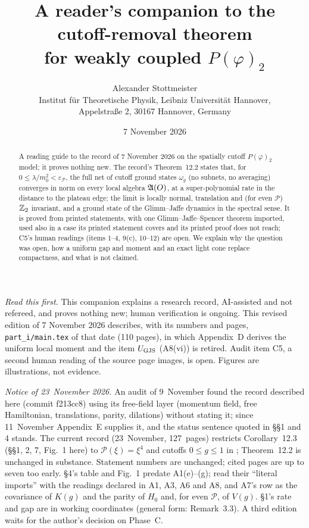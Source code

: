 \documentclass[11pt,a4paper]{article}
\title{A reader's companion to the cutoff-removal theorem\\ for weakly coupled $P(\varphi)_2$}
\author{Alexander Stottmeister\\[3pt]
  \normalsize Institut f\"ur Theoretische Physik, Leibniz Universit\"at Hannover,\\
  \normalsize Appelstra\ss e 2, 30167 Hannover, Germany}
\date{7 November 2026}
\begin{document}
\maketitle
\kern-6pt

\begin{statusnotice}\footnotesize
\emph{Read this first.} This companion explains a research record, AI-assisted and not
refereed, and proves nothing new; human verification is ongoing. This revised edition of
7 November 2026 describes, with its numbers and pages, \texttt{part\_i/main.tex} of that
date (110 pages), in which Appendix~D derives the uniform local moment and the item
$U_{\mathrm{GJS}}$ (A8(vi)) is retired. Audit item C5, a second human reading of the source page
images, is open. Figures are illustrations, not evidence.

\smallskip
\emph{Notice of 23~November 2026.} An audit of 9~November found the record described here
(commit f213cc8) using its free-field layer (momentum field, free Hamiltonian, translations,
parity, dilations) without stating it; since 11~November Appendix~E supplies it, and the
status sentence quoted in \S\S1 and 4 stands. The current record (23~November, 127~pages)
restricts Corollary~12.3 (\S\S1, 2, 7, Fig.~1 here) to $\mathscr P(\xi)=\xi^4$ and cutoffs
$0\le g\le1$ in \cite[(2.3)]{GJ3}; Theorem~12.2 is unchanged in substance. Statement numbers
are unchanged; cited pages are up to seven too early. \S4's table and Fig.~1 predate
A1(e)--(g); read their ``literal imports'' with the readings declared in A1, A3, A6 and A8,
and A7's row as the covariance of $K(g)$ and the parity of $H_0$ and, for even $\mathscr P$,
of $V(g)$. \S1's rate and gap are in working coordinates (general form: Remark~3.3). A third
edition waits for the author's decision on Phase~C.
\end{statusnotice}
\kern-8pt

\begin{abstract}
\noindent A reading guide to the record of 7 November 2026 on the spatially cutoff
$P(\varphi)_2$ model; it proves nothing new. The record's Theorem~12.2 states that, for
$0\le\lambda/m_0^2<\varepsilon_{\mathscr P}$, the full net of cutoff ground states
$\omega_g$ (no subnets, no averaging) converges in norm on every local algebra $\mathfrak{A}(O)$,
at a super-polynomial rate in the distance to the plateau edge; the limit is
locally normal, translation and (for even $\mathscr P$) $\mathbb{Z}_2$ invariant, and a ground state
of the Glimm--Jaffe dynamics in the spectral sense. It is proved from printed statements,
with one Glimm--Jaffe--Spencer theorem imported, used also in a case its printed statement
covers and its printed proof does not reach; C5's human readings (items 1--4, 9(c), 10--12)
are open.
We explain why the question was open, how a uniform gap and moment and an exact light
cone replace compactness, and what is not claimed.
\end{abstract}
\end{document}
